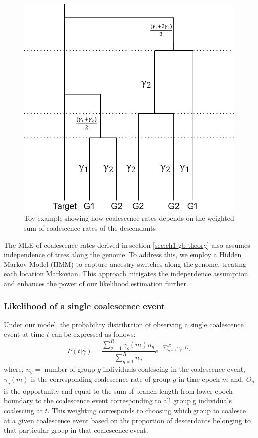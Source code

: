 \begin{figure}[h!]
    \centering
    \includegraphics[scale=0.275]{figures/ghost buster simon myers-Page-1.png}
    \caption{Toy example showing how coalescence rates depends on the weighted sum of coalescence rates of the descendants}
    \label{fig1}
\end{figure}

The MLE of coalescence rates derived in section \ref{sec:ch1-gb-theory} also assumes independence of trees along the genome. To address this, we employ a Hidden Markov Model (HMM) to capture ancestry switches along the genome, treating each location Markovian. This approach mitigates the independence assumption and enhances the power of our likelihood estimation further.

\subsubsection{Likelihood of a single coalescence event}

Under our model, the probability distribution of observing a single coalescence event at time $t$ can be expressed as follows:
\begin{equation}
    P(t | \gamma) = \frac{\sum_{g=1}^R\gamma_{g}(m)n_{g}}{\sum_{g=1}^R n_{g}}e^{-\sum_{g=1}^R \gamma_{g} \cdot O_{g}}
\end{equation}
where, $n_{g} =$ number of group $g$ individuals coalescing in the coalescence event, $\gamma_{g}(m)$ is the corresponding coalescence rate of group $g$ in time epoch $m$ and, $O_{g}$ is the opportunity and equal to the sum of branch length from lower epoch boundary to the coalescence event corresponding to all group g individuals coalescing at $t$. This weighting corresponds to choosing which group to coalesce at a given coalescence event based on the proportion of descendants belonging to that particular group in that coalescence event. 

